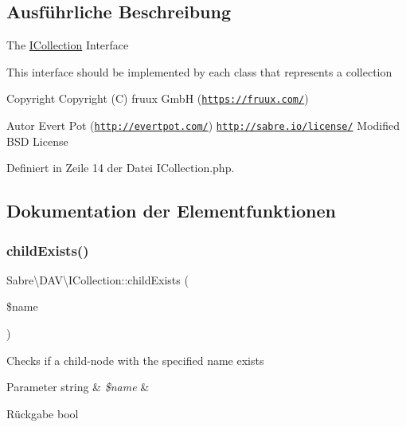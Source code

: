 \subsection{Ausführliche Beschreibung}
The \mbox{\hyperlink{interface_sabre_1_1_d_a_v_1_1_i_collection}{I\+Collection}} Interface

This interface should be implemented by each class that represents a collection

\begin{DoxyCopyright}{Copyright}
Copyright (C) fruux GmbH (\href{https://fruux.com/}{\tt https\+://fruux.\+com/}) 
\end{DoxyCopyright}
\begin{DoxyAuthor}{Autor}
Evert Pot (\href{http://evertpot.com/}{\tt http\+://evertpot.\+com/})  \href{http://sabre.io/license/}{\tt http\+://sabre.\+io/license/} Modified B\+SD License 
\end{DoxyAuthor}


Definiert in Zeile 14 der Datei I\+Collection.\+php.



\subsection{Dokumentation der Elementfunktionen}
\mbox{\label{interface_sabre_1_1_d_a_v_1_1_i_collection_a81b44dc1354370890279af58c34c7375}} 
\subsubsection{\texorpdfstring{child\+Exists()}{childExists()}}
{\footnotesize\ttfamily Sabre\textbackslash{}\+D\+A\+V\textbackslash{}\+I\+Collection\+::child\+Exists (\begin{DoxyParamCaption}\item[{}]{\$name }\end{DoxyParamCaption})}

Checks if a child-\/node with the specified name exists


\begin{DoxyParams}[1]{Parameter}
string & {\em \$name} & \\
\hline
\end{DoxyParams}
\begin{DoxyReturn}{Rückgabe}
bool 
\end{DoxyReturn}


